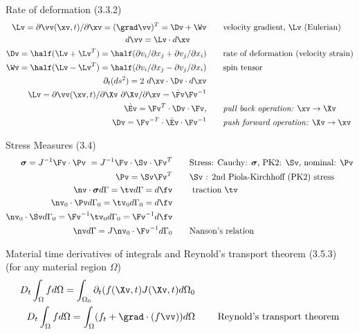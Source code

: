 \documentclass[11pt]{article}
\newcommand{\sigmav}{\boldsymbol{\sigma}}
\begin{document}
Rate of deformation (3.3.2)
 \begin{align}
  \Lv = \partial \vv(\xv,t) /\partial \xv = (\grad \vv)^T  = \Dv + \Wv & \qquad \mbox{velocity gradient, $\Lv$ (Eulerian)} \\
  d\vv = \Lv \cdot d \xv \qquad \mbox{} \\ 
  \Dv = \half( \Lv + \Lv^T) = \half( \partial v_i/ \partial x_j +  \partial v_j/ \partial x_i ) & \qquad \mbox{rate of deformation (velocity strain)} \\
  \Wv = \half( \Lv - \Lv^T) = \half( \partial v_i/ \partial x_j -  \partial v_j/ \partial x_i ) & \qquad \mbox{spin tensor} \\
  \partial_t ( ds^2) = 2~d\xv\cdot \Dv \cdot d\xv & \qquad \mbox{} \\
  \Lv = \partial \vv(\xv,t) /\partial \Xv ~ \partial \Xv/\partial\xv = \dot{\Fv} \Fv^{-1} & \qquad \mbox{} \\
  \dot{\Ev} = \Fv^T\cdot\Dv\cdot\Fv,  & \qquad \mbox{{\em pull back operation:} $\xv \rightarrow \Xv$} \\
  \Dv =  \Fv^{-T}\cdot \dot{\Ev} \cdot\Fv^{-1} & \qquad \mbox{{\em push forward operation:} $\Xv \rightarrow \xv$} 
\end{align}


Stress Measures (3.4)
 \begin{align}
  \sigmav =  J^{-1} \Fv\cdot\Pv ~= J^{-1} \Fv\cdot\Sv\cdot\Fv^{T} & \qquad \mbox{Stress: Cauchy: $\sigmav$, PK2: $\Sv$, nominal: $\Pv$} \\
  \Pv = \Sv \Fv^T & \qquad \mbox{$\Sv$ : 2nd Piola-Kirchhoff (PK2) stress} \\
  \nv\cdot\sigmav d\Gamma =\tv d\Gamma = d\fv  & \qquad \mbox{ traction $\tv$} \\
  \nv_0\cdot\Pv d\Gamma_0 =\tv_0 d\Gamma_0 = d\fv  & \qquad \mbox{} \\
  \nv_0\cdot\Sv d\Gamma_0 = \Fv^{-1} \tv_0 d\Gamma_0 = \Fv^{-1}d\fv  & \qquad \mbox{} \\
  \nv d\Gamma = J \nv_0 \cdot\Fv^{-1} d\Gamma_0 & \qquad \mbox{Nanson's relation} \\
\end{align}


Material time derivatives of integrals and Reynold's transport theorem (3.5.3) (for any material region $\Omega$)
 \begin{align}
  D_t \int_\Omega f d\Omega = \int_{\Omega_0}\partial_t( f(\Xv,t) J(\Xv,t) d\Omega_0 & \qquad \mbox{} \\
  D_t \int_\Omega f d\Omega = \int_\Omega (f_t + \grad\cdot( f\vv) ) d\Omega  & \qquad \mbox{ Reynold's transport theorem} \\
\end{align}
\end{document}
